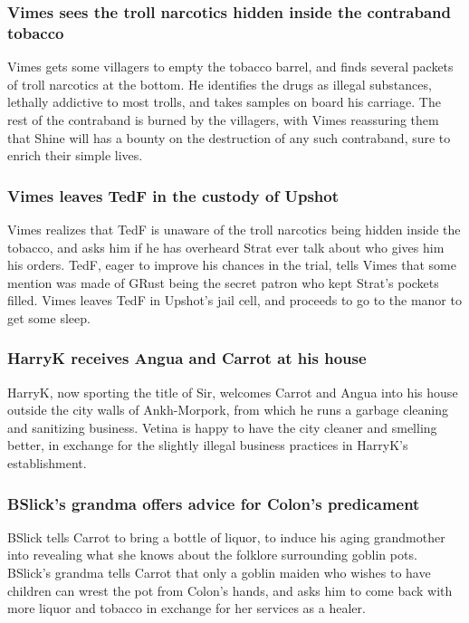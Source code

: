 \subsubsection{\Gls{Vimes} sees the troll narcotics hidden inside the contraband tobacco}
\Gls{Vimes} gets some villagers to empty the tobacco barrel, and finds several packets of troll
narcotics at the bottom. He identifies the drugs as illegal substances, lethally addictive to
most trolls, and takes samples on board his carriage. The rest of the contraband is burned by the
villagers, with \Gls{Vimes} reassuring them that \Gls{Shine} will has a bounty on the destruction of
any such contraband, sure to enrich their simple lives.

\subsubsection{\Gls{Vimes} leaves \Gls{TedF} in the custody of \Gls{Upshot}}
\Gls{Vimes} realizes that \Gls{TedF} is unaware of the troll narcotics being hidden inside the
tobacco, and asks him if he has overheard \Gls{Strat} ever talk about who gives him his orders.
\Gls{TedF}, eager to improve his chances in the trial, tells \Gls{Vimes} that some mention was made
of \Gls{GRust} being the secret patron who kept \Gls{Strat}'s pockets filled. \Gls{Vimes} leaves
\Gls{TedF} in \Gls{Upshot}'s jail cell, and proceeds to go to the manor to get some sleep.

\subsubsection{\Gls{HarryK} receives \Gls{Angua} and \Gls{Carrot} at his house}
\Gls{HarryK}, now sporting the title of Sir, welcomes \Gls{Carrot} and \Gls{Angua} into his
house outside the city walls of Ankh-Morpork, from which he runs a garbage cleaning and sanitizing
business. \Gls{Vetina} is happy to have the city cleaner and smelling better, in exchange for the
slightly illegal business practices in \Gls{HarryK}'s establishment.

\subsubsection{\Gls{BSlick}'s grandma offers advice for \Gls{Colon}'s predicament}
\Gls{BSlick} tells \Gls{Carrot} to bring a bottle of liquor, to induce his aging grandmother into
revealing what she knows about the folklore surrounding goblin pots. \Gls{BSlick}'s grandma tells
\Gls{Carrot} that only a goblin maiden who wishes to have children can wrest the pot from
\Gls{Colon}'s hands, and asks him to come back with more liquor and tobacco in exchange for her
services as a healer.


